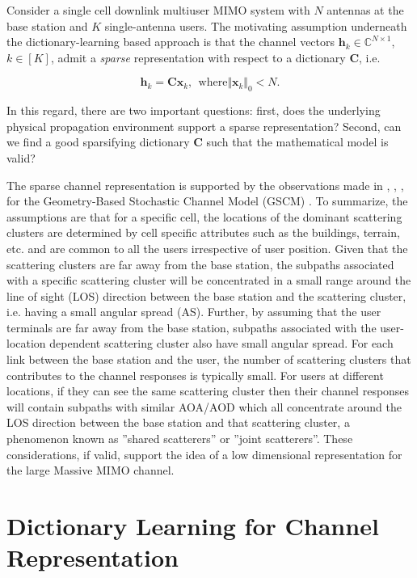 Consider a single cell downlink multiuser MIMO system
with $N$ antennas at the base station and $K$ single-antenna
users. The motivating assumption underneath the dictionary-learning based approach is that the channel vectors $\mathbf{h}_k\in \mathbb{C}^{N\times 1}$, $k\in [K]$, admit a \textit{sparse} representation with respect to a dictionary $\mathbf{C}$, i.e. 

\begin{equation}
\mathbf{h}_k=\mathbf{C}\mathbf{x}_k, \:\: \mathrm{where} \Vert\mathbf{x}_k\Vert_{0}< N.
\label{eq:channel_representation}
\end{equation} 

In this regard, there are two important 
questions: first, does the underlying physical propagation environment support a sparse representation?
Second, can we find a good sparsifying dictionary $\mathbf{C}$ 
such that the mathematical model is valid?

The sparse channel representation is supported by the observations made in \cite{CE_FDD:journals/corr/DingR16}, \cite{CE_FDD_REF4}, \cite{GSCM}, \cite{CE_FDD_REF_42} for the Geometry-Based Stochastic Channel Model (GSCM) \cite{GSCM}. To summarize, the assumptions are that for a specific cell, the locations of the dominant scattering clusters are determined by cell specific attributes such as the buildings, terrain, etc. and are common to all the users
irrespective of user position. Given that the scattering clusters are far away from the base
station, the subpaths associated with a specific scattering cluster will be concentrated in a
small range around the line of sight (LOS) direction between the base station and the scattering
cluster, i.e. having a small angular spread (AS). Further, by assuming that the user terminals are far away from the base station,
subpaths associated with the user-location dependent scattering cluster also have small angular
spread. For each link between the base station and the user, the number of scattering clusters
that contributes to the channel responses is typically small. For users
at different locations, if they can see the same scattering cluster then their channel responses
will contain subpaths with similar AOA/AOD which all concentrate around the LOS direction
between the base station and that scattering cluster, a phenomenon known as ”shared scatterers” 
or ”joint scatterers”. These considerations, if valid, support the idea of a low dimensional
representation for the large Massive MIMO channel. 

\section{Dictionary Learning for Channel Representation}

